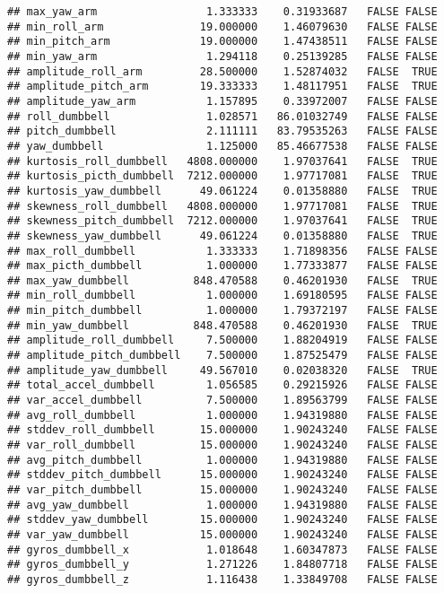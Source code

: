 \documentclass[]{article}
\begin{document}
\begin{verbatim}
## max_yaw_arm                 1.333333    0.31933687   FALSE FALSE
## min_roll_arm               19.000000    1.46079630   FALSE FALSE
## min_pitch_arm              19.000000    1.47438511   FALSE FALSE
## min_yaw_arm                 1.294118    0.25139285   FALSE FALSE
## amplitude_roll_arm         28.500000    1.52874032   FALSE  TRUE
## amplitude_pitch_arm        19.333333    1.48117951   FALSE  TRUE
## amplitude_yaw_arm           1.157895    0.33972007   FALSE FALSE
## roll_dumbbell               1.028571   86.01032749   FALSE FALSE
## pitch_dumbbell              2.111111   83.79535263   FALSE FALSE
## yaw_dumbbell                1.125000   85.46677538   FALSE FALSE
## kurtosis_roll_dumbbell   4808.000000    1.97037641   FALSE  TRUE
## kurtosis_picth_dumbbell  7212.000000    1.97717081   FALSE  TRUE
## kurtosis_yaw_dumbbell      49.061224    0.01358880   FALSE  TRUE
## skewness_roll_dumbbell   4808.000000    1.97717081   FALSE  TRUE
## skewness_pitch_dumbbell  7212.000000    1.97037641   FALSE  TRUE
## skewness_yaw_dumbbell      49.061224    0.01358880   FALSE  TRUE
## max_roll_dumbbell           1.333333    1.71898356   FALSE FALSE
## max_picth_dumbbell          1.000000    1.77333877   FALSE FALSE
## max_yaw_dumbbell          848.470588    0.46201930   FALSE  TRUE
## min_roll_dumbbell           1.000000    1.69180595   FALSE FALSE
## min_pitch_dumbbell          1.000000    1.79372197   FALSE FALSE
## min_yaw_dumbbell          848.470588    0.46201930   FALSE  TRUE
## amplitude_roll_dumbbell     7.500000    1.88204919   FALSE FALSE
## amplitude_pitch_dumbbell    7.500000    1.87525479   FALSE FALSE
## amplitude_yaw_dumbbell     49.567010    0.02038320   FALSE  TRUE
## total_accel_dumbbell        1.056585    0.29215926   FALSE FALSE
## var_accel_dumbbell          7.500000    1.89563799   FALSE FALSE
## avg_roll_dumbbell           1.000000    1.94319880   FALSE FALSE
## stddev_roll_dumbbell       15.000000    1.90243240   FALSE FALSE
## var_roll_dumbbell          15.000000    1.90243240   FALSE FALSE
## avg_pitch_dumbbell          1.000000    1.94319880   FALSE FALSE
## stddev_pitch_dumbbell      15.000000    1.90243240   FALSE FALSE
## var_pitch_dumbbell         15.000000    1.90243240   FALSE FALSE
## avg_yaw_dumbbell            1.000000    1.94319880   FALSE FALSE
## stddev_yaw_dumbbell        15.000000    1.90243240   FALSE FALSE
## var_yaw_dumbbell           15.000000    1.90243240   FALSE FALSE
## gyros_dumbbell_x            1.018648    1.60347873   FALSE FALSE
## gyros_dumbbell_y            1.271226    1.84807718   FALSE FALSE
## gyros_dumbbell_z            1.116438    1.33849708   FALSE FALSE

\end{verbatim}
\end{document}
